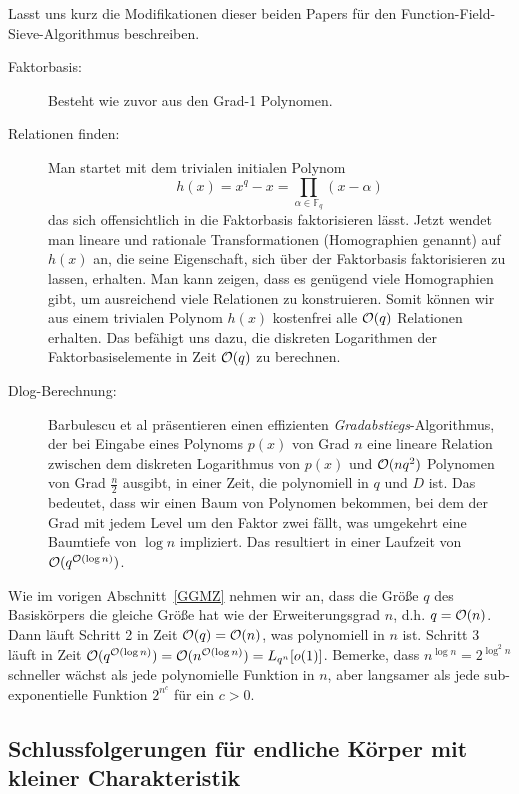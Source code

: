 \begin{refsegment}
Lasst uns kurz die Modifikationen dieser beiden Papers für den Function-Field-Sieve-Algo\-rith\-mus beschreiben.


\begin{description}
\item[Faktorbasis:] Besteht wie zuvor aus den Grad-1 Polynomen.
\item[Relationen finden:] Man startet mit dem trivialen initialen Polynom
$$
  h(x)= x^q-x = \prod_{\alpha \in \mathbb{F}_q} (x-\alpha)
$$
das sich offensichtlich in die Faktorbasis faktorisieren lässt. Jetzt wendet man lineare und rationale Transformationen (Homographien genannt) auf $h(x)$ an, die seine Eigenschaft, sich über der Faktorbasis faktorisieren zu lassen, erhalten. Man kann zeigen, dass es genügend viele Homographien gibt, um ausreichend viele Relationen zu konstruieren. Somit können wir aus einem trivialen Polynom $h(x)$ kostenfrei alle ${\cal O}(q)$ Relationen erhalten. Das befähigt uns dazu, die diskreten Logarithmen der Faktorbasiselemente in Zeit ${\cal O}(q)$ zu berechnen.
\item[Dlog-Berechnung:] Barbulescu et al präsentieren einen effizienten {\em Gradabstiegs}-Algorithmus, der bei Eingabe eines Polynoms $p(x)$ von Grad $n$ eine lineare Relation zwischen dem diskreten Logarithmus von $p(x)$ und ${\cal O}(nq^2)$ Polynomen von Grad $\frac n 2$ ausgibt, in einer Zeit, die polynomiell in $q$ und $D$ ist. Das bedeutet, dass wir einen Baum von Polynomen bekommen, bei dem der Grad mit jedem Level um den Faktor zwei fällt, was umgekehrt eine Baumtiefe von $\log n$ impliziert. Das resultiert in einer Laufzeit von ${\cal O}(q^{{\cal O}(\log n)})$.
\end{description}

Wie im vorigen Abschnitt~\ref{GGMZ} nehmen wir an, dass die Größe $q$ des Basiskörpers die gleiche Größe hat wie der Erweiterungsgrad $n$, d.h. $q={\cal O}(n)$. Dann läuft Schritt 2 in Zeit ${\cal O}(q)={\cal O}(n)$, was polynomiell in $n$ ist. Schritt 3 läuft in Zeit ${\cal O}(q^{{\cal O}(\log n)})={\cal O}(n^{{\cal O}(\log n)}) = L_{q^n}[o(1)]$. Bemerke, dass $n^{\log n}=2^{\log^2 n}$ schneller wächst als jede polynomielle Funktion in $n$, aber langsamer als jede sub-exponentielle Funktion $2^{n^{c}}$ für ein $c>0$.


\subsection{Schlussfolgerungen für endliche Körper mit kleiner Charakteristik}


\end{refsegment}

